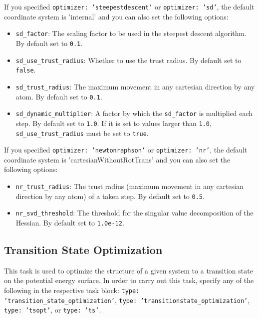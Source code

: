 \documentclass[]{tufte-book}
\begin{document}
If you specified \texttt{optimizer: 'steepestdescent'} or \texttt{optimizer: 'sd'}, the default coordinate system is 'internal'
and you can also set the following options:
\begin{itemize}
\item \texttt{sd\_factor}: The scaling factor to be used in the steepest descent algorithm. By default set to \texttt{0.1}.
\item \texttt{sd\_use\_trust\_radius}: Whether to use the trust radius. By default set to \texttt{false}.
\item \texttt{sd\_trust\_radius}: The maximum movement in any cartesian direction by any atom. By default set to \texttt{0.1}.
\item \texttt{sd\_dynamic\_multiplier}: A factor by which the \texttt{sd\_factor} is multiplied each step. By default set to \texttt{1.0}.
If it is set to values larger than \texttt{1.0}, \texttt{sd\_use\_trust\_radius} must be set to \texttt{true}.
\end{itemize}

If you specified \texttt{optimizer: 'newtonraphson'} or \texttt{optimizer: 'nr'}, the default coordinate system is 'cartesianWithoutRotTrans'
and you can also set the following options:
\begin{itemize}
\item \texttt{nr\_trust\_radius}: The trust radius (maximum movement in any cartesian direction by any atom) of a taken step.
By default set to \texttt{0.5}.
\item \texttt{nr\_svd\_threshold}: The threshold for the singular value decomposition of the Hessian. By default set to
\texttt{1.0e-12}.
\end{itemize}

\subsection{Transition State Optimization}

This task is used to optimize the structure of a given system to a transition state on the potential energy surface. In
order to carry out this task, specify any of the following in the respective task block: \texttt{type: 'transition\_state\_optimization'},
\texttt{type: 'transitionstate\_optimization'}, \texttt{type: 'tsopt'}, or \texttt{type: 'ts'}.
\end{document}
